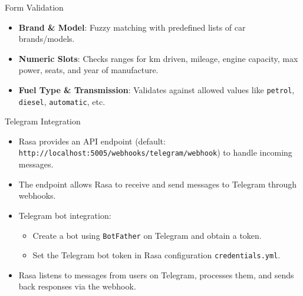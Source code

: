 \documentclass{beamer}
\begin{document}
\begin{frame}{Form Validation}
	\begin{itemize}
		\item \textbf{Brand \& Model}: Fuzzy matching with predefined lists of car brands/models.
		\item \textbf{Numeric Slots}: Checks ranges for km driven, mileage, engine capacity, max power, seats, and year of manufacture.
		\item \textbf{Fuel Type \& Transmission}: Validates against allowed values like \texttt{petrol}, \texttt{diesel}, \texttt{automatic}, etc.
	\end{itemize}
\end{frame}

\begin{frame}{Telegram Integration}
	
	\begin{itemize}
		\item Rasa provides an API endpoint (default: \texttt{http://localhost:5005/webhooks/telegram/webhook}) to handle incoming messages.
		\item The endpoint allows Rasa to receive and send messages to Telegram through webhooks.
		\item Telegram bot integration:
		\begin{itemize}
			\item Create a bot using \texttt{BotFather} on Telegram and obtain a token.
			\item Set the Telegram bot token in Rasa configuration \texttt{credentials.yml}.
		\end{itemize}
		\item Rasa listens to messages from users on Telegram, processes them, and sends back responses via the webhook.
	\end{itemize}
	
\end{frame}
\end{document}
